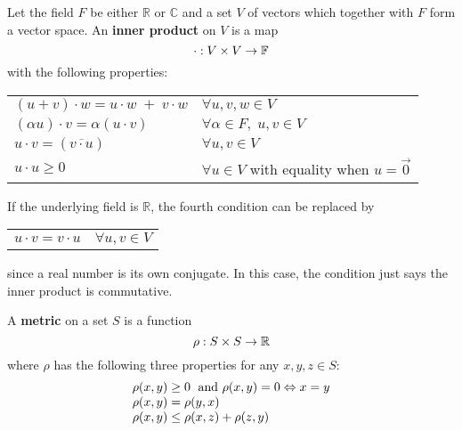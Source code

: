 \begin{definition*} Let the field $F$ be either $\mathbb{R}$ or $\mathbb{C}$ and a set $V$ of vectors which together with $F$ form a vector space.  An \textbf{inner product} on $V$ is a map 
\[
\cdot : V\times V\rightarrow\mathbb{F}
\vspace{0.3 cm}
\]
with the following properties:
\par\vspace{0.2 cm}
\begin{tabular}{ll}
$(u+v)\cdot w = u\cdot w\;+\;v\cdot w $ & $\forall u,v,w\in V$\\
$(\alpha u)\cdot v=\alpha(u\cdot v)$ & $\forall \alpha\in F,\;u,v\in V$\\
$u\cdot v = (\overline{v\cdot u})$  & $\forall u,v\in V$\\
$u\cdot u\geq 0$ & $\forall u\in V$ with equality when $u=\vec{0}$\\ 
\end{tabular}
\par\vspace{0.3 cm}
If the underlying field is $\mathbb{R}$, the fourth condition can be replaced by
\par\vspace{0.2 cm}
\begin{tabular}{ll}
$u\cdot v = v\cdot u$  & $\forall u,v\in V$\\
\end{tabular}
\par\vspace{0.2 cm}
since a real number is its own conjugate.  In this case, the condition just says the inner product is commutative.
\end{definition*}
\par\vspace{1 cm}
\begin{definition*}[metric] A \textbf{metric} on a set $S$ is a function
\[
\rho:S\times S\rightarrow\mathbb{R}
\vspace{0.3 cm}
\]
where $\rho$ has the following three properties for any $x,y,z\in S$: 
\[
\begin{array}{l}
\rho(x,y)\geq0\;\mbox{ and } \rho(x,y)=0\Leftrightarrow x=y\\
\rho(x,y)=\rho(y,x)\\
\rho(x,y)\leq \rho(x,z)+\rho(z,y)\\
\end{array}
\vspace{0.3 cm}
\]
\end{definition*}
